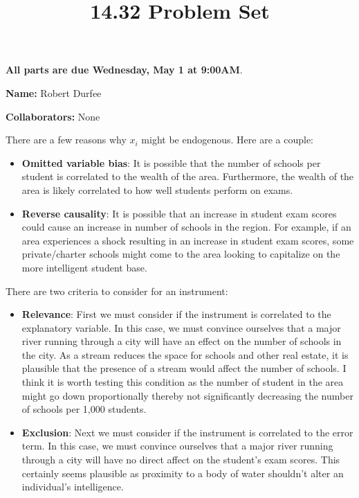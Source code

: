 \documentclass[12pt,twoside]{article}
\title{14.32 Problem Set \theproblemsetnum}
\newcommand{\theproblemsetnum}{5}
\newcommand{\releasedate}{Friday, April 19}
\newcommand{\partaduedate}{Wednesday, May 1}
\begin{document}
\handout{Problem Set \theproblemsetnum}{\releasedate}
\textbf{All parts are due {\bf \partaduedate} at {\bf 9:00AM}}.

\setlength{\parindent}{0pt}
\medskip\hrulefill\medskip

{\bf Name:} Robert Durfee

\medskip

{\bf Collaborators:} None

\medskip\hrulefill

\begin{problems}

\problem  %

\begin{problemparts}

\problempart  %

There are a few reasons why $x_i$ might be endogenous. Here are a couple:

\begin{itemize}
    \item {\bf Omitted variable bias}: It is possible that the number of
    schools per student is correlated to the wealth of the area. Furthermore,
    the wealth of the area is likely correlated to how well students perform
    on exams.
    \item {\bf Reverse causality}: It is possible that an increase in student
    exam scores could cause an increase in number of schools in the region.
    For example, if an area experiences a shock resulting in an increase in
    student exam scores, some private/charter schools might come to the area
    looking to capitalize on the more intelligent student base.
\end{itemize}

\problempart  %

There are two criteria to consider for an instrument:

\begin{itemize}
    \item {\bf Relevance}: First we must consider if the instrument is
    correlated to the explanatory variable. In this case, we must convince
    ourselves that a major river running through a city will have an effect
    on the number of schools in the city. As a stream reduces the space for
    schools and other real estate, it is plausible that the presence of a
    stream would affect the number of schools. I think it is worth testing
    this condition as the number of student in the area might go down
    proportionally thereby not significantly decreasing the number of schools
    per 1,000 students.
    \item {\bf Exclusion}: Next we must consider if the instrument is
    correlated to the error term. In this case, we must convince ourselves
    that a major river running through a city will have no direct affect on
    the student's exam scores. This certainly seems plausible as proximity to
    a body of water shouldn't alter an individual's intelligence.
\end{itemize}


\end{problemparts}
\end{problems}
\end{document}
